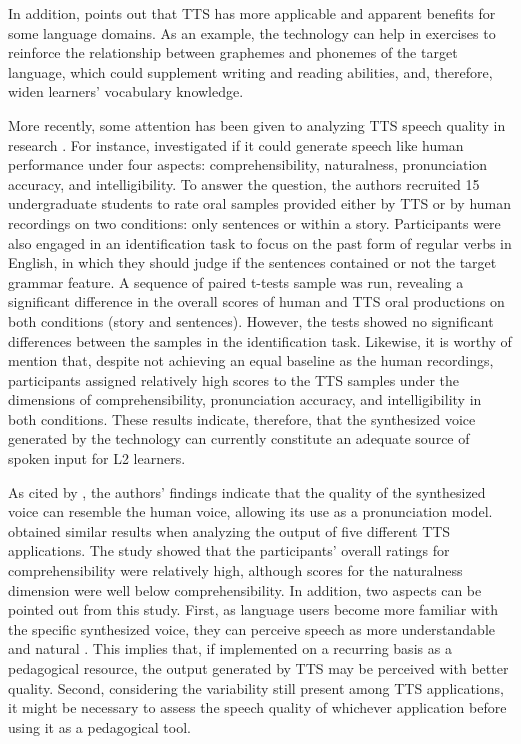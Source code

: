 \documentclass[english]{textolivre}
\begin{document}
In addition, \textcite{handley2013} points out that TTS has more applicable and apparent benefits for some language domains. As an example, the technology can help in exercises to reinforce the relationship between graphemes and phonemes of the target language, which could supplement writing and reading abilities, and, therefore, widen learners’ vocabulary knowledge.

More recently, some attention has been given to analyzing TTS speech quality in research \cite{liakin2017}. For instance, \textcite{cardoso2015} investigated if it could generate speech like human performance under four aspects: comprehensibility, naturalness, pronunciation accuracy, and intelligibility. To answer the question, the authors recruited 15 undergraduate students to rate oral samples provided either by TTS or by human recordings on two conditions: only sentences or within a story. Participants were also engaged in an identification task to focus on the past form of regular verbs in English, in which they should judge if the sentences contained or not the target grammar feature. A sequence of paired t-tests sample was run, revealing a significant difference in the overall scores of human and TTS oral productions on both conditions (story and sentences). However, the tests showed no significant differences between the samples in the identification task. Likewise, it is worthy of mention that, despite not achieving an equal baseline as the human recordings, participants assigned relatively high scores to the TTS samples under the dimensions of comprehensibility, pronunciation accuracy, and intelligibility in both conditions. These results indicate, therefore, that the synthesized voice generated by the technology can currently constitute an adequate source of spoken input for L2 learners.

As cited by \textcite{liakin2017}, the authors' findings indicate that the quality of the synthesized voice can resemble the human voice, allowing its use as a pronunciation model. \textcite{grimshaw2018} obtained similar results when analyzing the output of five different TTS applications. The study showed that the participants' overall ratings for comprehensibility were relatively high, although scores for the naturalness dimension were well below comprehensibility. In addition, two aspects can be pointed out from this study. First, as language users become more familiar with the specific synthesized voice, they can perceive speech as more understandable and natural . This implies that, if implemented on a recurring basis as a pedagogical resource, the output generated by TTS may be perceived with better quality. Second, considering the variability still present among TTS applications, it might be necessary to assess the speech quality of whichever application before using it as a pedagogical tool.
\end{document}

